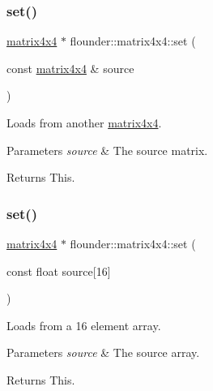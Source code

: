 \subsubsection{\texorpdfstring{set()}{set()}\hspace{0.1cm}{\footnotesize\ttfamily [1/2]}}
{\footnotesize\ttfamily \hyperlink{classflounder_1_1matrix4x4}{matrix4x4} $\ast$ flounder\+::matrix4x4\+::set (\begin{DoxyParamCaption}\item[{const \hyperlink{classflounder_1_1matrix4x4}{matrix4x4} \&}]{source }\end{DoxyParamCaption})}



Loads from another \hyperlink{classflounder_1_1matrix4x4}{matrix4x4}. 


\begin{DoxyParams}{Parameters}
{\em source} & The source matrix. \\
\hline
\end{DoxyParams}
\begin{DoxyReturn}{Returns}
This. 
\end{DoxyReturn}
\mbox{\label{classflounder_1_1matrix4x4_a891d47fa2cff36634136c06f6ac24713}} 
\subsubsection{\texorpdfstring{set()}{set()}\hspace{0.1cm}{\footnotesize\ttfamily [2/2]}}
{\footnotesize\ttfamily \hyperlink{classflounder_1_1matrix4x4}{matrix4x4} $\ast$ flounder\+::matrix4x4\+::set (\begin{DoxyParamCaption}\item[{const float}]{source\mbox{[}16\mbox{]} }\end{DoxyParamCaption})}



Loads from a 16 element array. 


\begin{DoxyParams}{Parameters}
{\em source} & The source array. \\
\hline
\end{DoxyParams}
\begin{DoxyReturn}{Returns}
This. 
\end{DoxyReturn}
\mbox{\label{classflounder_1_1matrix4x4_a1e6d01f9949c6498de679e7db6c52aae}} 

